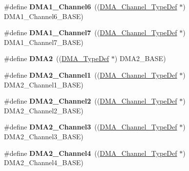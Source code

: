 \begin{DoxyCompactItemize}
\item 
\hypertarget{group___peripheral__declaration_gac013c4376e4797831b5ddd2a09519df8}{\#define {\bfseries D\-M\-A1\-\_\-\-Channel6}~((\hyperlink{struct_d_m_a___channel___type_def}{D\-M\-A\-\_\-\-Channel\-\_\-\-Type\-Def} $\ast$) D\-M\-A1\-\_\-\-Channel6\-\_\-\-B\-A\-S\-E)}\label{group___peripheral__declaration_gac013c4376e4797831b5ddd2a09519df8}

\item 
\hypertarget{group___peripheral__declaration_ga4f9c23b3d1add93ed206b5c9afa5cda3}{\#define {\bfseries D\-M\-A1\-\_\-\-Channel7}~((\hyperlink{struct_d_m_a___channel___type_def}{D\-M\-A\-\_\-\-Channel\-\_\-\-Type\-Def} $\ast$) D\-M\-A1\-\_\-\-Channel7\-\_\-\-B\-A\-S\-E)}\label{group___peripheral__declaration_ga4f9c23b3d1add93ed206b5c9afa5cda3}

\item 
\hypertarget{group___peripheral__declaration_ga506520140eec1708bc7570c49bdf972d}{\#define {\bfseries D\-M\-A2}~((\hyperlink{struct_d_m_a___type_def}{D\-M\-A\-\_\-\-Type\-Def} $\ast$) D\-M\-A2\-\_\-\-B\-A\-S\-E)}\label{group___peripheral__declaration_ga506520140eec1708bc7570c49bdf972d}

\item 
\hypertarget{group___peripheral__declaration_gad86c75e1ff89e03e15570f47962865c8}{\#define {\bfseries D\-M\-A2\-\_\-\-Channel1}~((\hyperlink{struct_d_m_a___channel___type_def}{D\-M\-A\-\_\-\-Channel\-\_\-\-Type\-Def} $\ast$) D\-M\-A2\-\_\-\-Channel1\-\_\-\-B\-A\-S\-E)}\label{group___peripheral__declaration_gad86c75e1ff89e03e15570f47962865c8}

\item 
\hypertarget{group___peripheral__declaration_ga316024020799373b9d8e35c316c74f24}{\#define {\bfseries D\-M\-A2\-\_\-\-Channel2}~((\hyperlink{struct_d_m_a___channel___type_def}{D\-M\-A\-\_\-\-Channel\-\_\-\-Type\-Def} $\ast$) D\-M\-A2\-\_\-\-Channel2\-\_\-\-B\-A\-S\-E)}\label{group___peripheral__declaration_ga316024020799373b9d8e35c316c74f24}

\item 
\hypertarget{group___peripheral__declaration_ga6dca52a79587e0ca9a5d669048b4c7eb}{\#define {\bfseries D\-M\-A2\-\_\-\-Channel3}~((\hyperlink{struct_d_m_a___channel___type_def}{D\-M\-A\-\_\-\-Channel\-\_\-\-Type\-Def} $\ast$) D\-M\-A2\-\_\-\-Channel3\-\_\-\-B\-A\-S\-E)}\label{group___peripheral__declaration_ga6dca52a79587e0ca9a5d669048b4c7eb}

\item 
\hypertarget{group___peripheral__declaration_ga612b396657695191ad740b0b59bc9f12}{\#define {\bfseries D\-M\-A2\-\_\-\-Channel4}~((\hyperlink{struct_d_m_a___channel___type_def}{D\-M\-A\-\_\-\-Channel\-\_\-\-Type\-Def} $\ast$) D\-M\-A2\-\_\-\-Channel4\-\_\-\-B\-A\-S\-E)}\label{group___peripheral__declaration_ga612b396657695191ad740b0b59bc9f12}


\end{DoxyCompactItemize}

